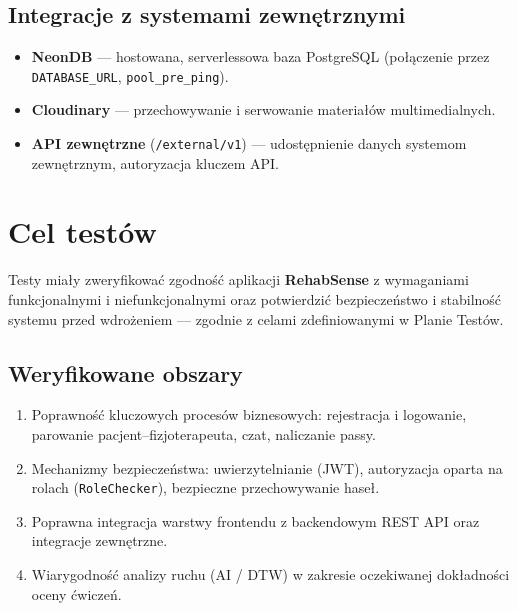 \documentclass[11pt,a4paper]{article}
\newcommand{\sysname}{\textbf{RehabSense}}
\begin{document}
\subsection{Integracje z systemami zewnętrznymi}
\begin{itemize}
  \item \textbf{NeonDB} — hostowana, serverlessowa baza PostgreSQL (połączenie przez \texttt{DATABASE\_URL}, \texttt{pool\_pre\_ping}).
  \item \textbf{Cloudinary} — przechowywanie i serwowanie materiałów multimedialnych.
  \item \textbf{API zewnętrzne} (\texttt{/external/v1}) — udostępnienie danych systemom zewnętrznym, autoryzacja kluczem API.
\end{itemize}

\section{Cel testów}

Testy miały zweryfikować zgodność aplikacji \sysname{} z wymaganiami funkcjonalnymi i niefunkcjonalnymi oraz potwierdzić bezpieczeństwo i stabilność systemu przed wdrożeniem — zgodnie z celami zdefiniowanymi w Planie Testów.

\subsection{Weryfikowane obszary}
\begin{enumerate}
  \item Poprawność kluczowych procesów biznesowych: rejestracja i logowanie, parowanie pacjent–fizjoterapeuta, czat, naliczanie passy.
  \item Mechanizmy bezpieczeństwa: uwierzytelnianie (JWT), autoryzacja oparta na rolach (\texttt{RoleChecker}), bezpieczne przechowywanie haseł.
  \item Poprawna integracja warstwy frontendu z backendowym REST API oraz integracje zewnętrzne.
  \item Wiarygodność analizy ruchu (AI / DTW) w zakresie oczekiwanej dokładności oceny ćwiczeń.
\end{enumerate}
\end{document}
